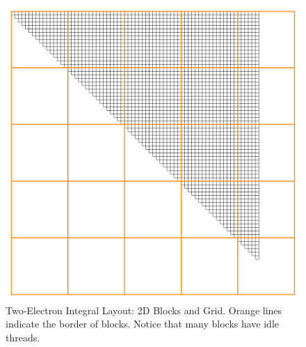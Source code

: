 \documentclass[12pt]{report}
\begin{document}
\begin{figure}[h!]
\includegraphics[width=1\textwidth]{Figures/gen_mat_block_layout.png}
\caption[Two-Electron Integral Layout: 2D Blocks and Grid]
{Two-Electron Integral Layout: 2D Blocks and Grid. Orange lines indicate the border of blocks. Notice that many blocks have idle threads.}
\label{fig:genmatblock}
\end{figure}
\end{document}
